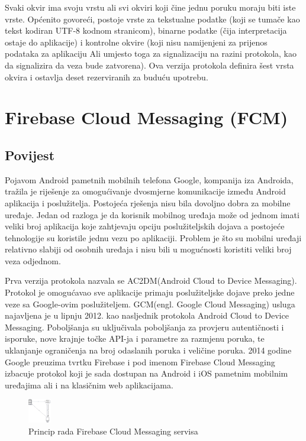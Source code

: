\documentclass[times, utf8, zavrsni]{fer}
\begin{document}
Svaki okvir ima svoju vrstu ali svi okviri koji čine jednu poruku moraju biti iste vrste. Općenito govoreći, postoje vrste za tekstualne podatke (koji se tumače kao tekst kodiran UTF-8 kodnom stranicom), binarne podatke (čija interpretacija ostaje do aplikacije) i kontrolne okvire (koji nisu namijenjeni za prijenos podataka za aplikaciju Ali umjesto toga za signalizaciju na razini protokola, kao da signalizira da veza bude zatvorena). Ova verzija protokola definira šest vrsta okvira i ostavlja deset rezerviranih za buduću upotrebu.

\section{Firebase Cloud Messaging (FCM)}

\subsection{Povijest}
Pojavom Android pametnih mobilnih telefona Google, kompanija iza Androida, tražila je riješenje za omogućivanje dvosmjerne komunikacije između Android aplikacija i poslužitelja. Postojeća rješenja nisu bila dovoljno dobra za mobilne uređaje. Jedan od razloga je da korisnik mobilnog uređaja može od jednom imati veliki broj aplikacija koje zahtjevaju opciju poslužiteljskih dojava a postojeće tehnologije su koristile jednu vezu po aplikaciji. Problem je što su mobilni uređaji relativno slabiji od osobnih uređaja i nisu bili u mogućnosti koristiti veliki broj veza odjednom.

Prva verzija protokola nazvala se AC2DM(Android Cloud to Device Messaging). Protokol je omogućavao sve aplikacije primaju poslužiteljske dojave preko jedne veze sa Google-ovim poslužiteljem. GCM(engl. Google Cloud Messaging) usluga najavljena je u lipnju 2012. kao nasljednik protokola Android Cloud to Device Messaging. Poboljšanja su uključivala poboljšanja za provjeru autentičnosti i isporuke, nove krajnje točke API-ja i parametre za razmjenu poruka, te uklanjanje ograničenja na broj odaslanih poruka i veličine poruka. 2014 godine Google preuzima tvrtku Firebase i pod imenom Firebase Cloud Messaging izbacuje protokol koji je sada dostupan na Android i iOS pametnim mobilnim uređajima ali i na klasičnim web aplikacijama.

\begin{figure}[htb]
\centering
\includegraphics[width=1cm]{img/fcm.png}
\caption{Princip rada Firebase Cloud Messaging servisa}
\label{fig:fcm-image}
\end{figure}
\end{document}
